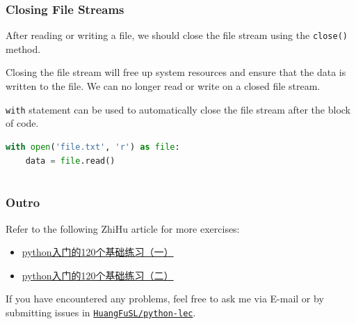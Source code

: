 \documentclass[beamer, en, version=2.0]{huangfusl-template}
\begin{document}
    \begin{frame}[fragile]
        \frametitle{Closing File Streams}

        After reading or writing a file, we should close the file stream using the {\footnotesize\verb|close()|} method.

        Closing the file stream will free up system resources and ensure that the data is written to the file. We can no longer read or write on a closed file stream.

        {\footnotesize\verb|with|} statement can be used to automatically close the file stream after the block of code.

\begin{lstlisting}[language=python]
with open('file.txt', 'r') as file:
    data = file.read()
\end{lstlisting}
    \end{frame}
    \section*{}
    \begin{frame}
        \frametitle{Outro}

        Refer to the following ZhiHu article for more exercises:

        \begin{itemize}
            \item \href{https://zhuanlan.zhihu.com/p/87891142}{\color{darkblue}python入门的120个基础练习（一）}
            \item \href{https://zhuanlan.zhihu.com/p/87894542}{\color{darkblue}python入门的120个基础练习（二）}
        \end{itemize}

        If you have encountered any problems, feel free to ask me via E-mail or by submitting issues in {\href{https://github.com/HuangFuSL/python-lec/issues}{\texttt{\color{darkblue}\footnotesize{}HuangFuSL/python-lec}}}.
    \end{frame}
    \begin{frame}
        \mythanks
    \end{frame}
\end{document}
